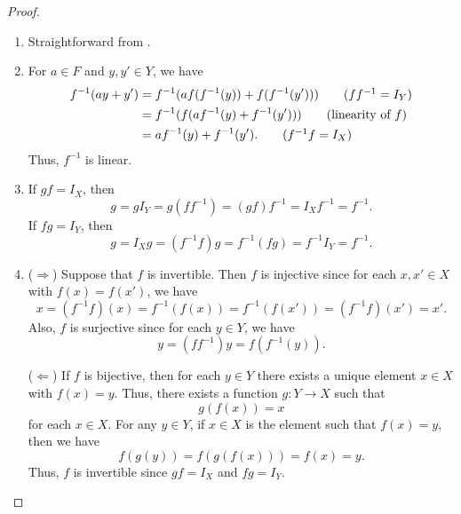 \begin{proof}
  \leavevmode
  \begin{enumerate}
    \item Straightforward from .
    
    \item For $a \in F$ and $y, y' \in Y$, we have
    \begin{align*}
      f^{-1}(ay + y')
      &= f^{-1}(af(f^{-1}(y)) + f(f^{-1}(y'))) \tag{$ff^{-1} = I_Y$} \\
      &= f^{-1}(f(af^{-1}(y) + f^{-1}(y'))) \tag{linearity of $f$} \\
      &= af^{-1}(y) + f^{-1}(y'). \tag{$f^{-1}f = I_X$}
    \end{align*}
    Thus, $f^{-1}$ is linear.
    
    \item
    If $gf = I_X$, then
    \begin{equation*}
      g = gI_Y = g(ff^{-1}) = (gf)f^{-1} = I_Xf^{-1} = f^{-1}.
    \end{equation*}
    If $fg = I_Y$, then
    \begin{equation*}
      g = I_Xg = (f^{-1}f)g = f^{-1}(fg) = f^{-1}I_Y = f^{-1}.
    \end{equation*}
    
    \item
    ($\Rightarrow$)
    Suppose that $f$ is invertible.
    Then $f$ is injective since for each $x, x' \in X$ with $f(x) = f(x')$,
    we have
    \begin{equation*}
      x = (f^{-1}f)(x) = f^{-1}(f(x)) = f^{-1}(f(x')) = (f^{-1}f)(x') = x'.
    \end{equation*}
    Also, $f$ is surjective since for each $y \in Y$, we have
    \begin{equation*}
      y = (ff^{-1})y = f(f^{-1}(y)).
    \end{equation*}

    ($\Leftarrow$)
    If $f$ is bijective, then for each $y \in Y$ there exists a unique element
    $x \in X$ with $f(x) = y$.
    Thus, there exists a function $g: Y \to X$ such that
    \begin{equation*}
      g(f(x)) = x
    \end{equation*}
    for each $x \in X$.
    For any $y \in Y$, if $x \in X$ is the element such that $f(x) = y$,
    then we have
    \begin{equation*}
      f(g(y)) = f(g(f(x))) = f(x) = y.
    \end{equation*}
    Thus, $f$ is invertible since $gf = I_X$ and $fg = I_Y$. \qedhere
  \end{enumerate}
\end{proof}

